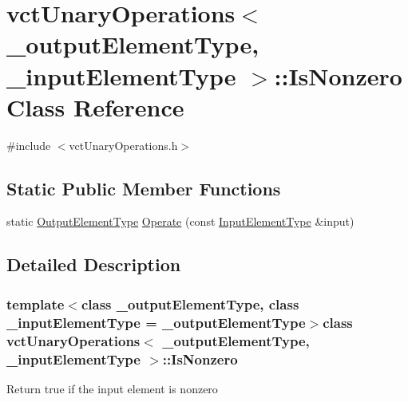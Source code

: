 \hypertarget{classvct_unary_operations_1_1_is_nonzero}{\section{vct\-Unary\-Operations$<$ \-\_\-output\-Element\-Type, \-\_\-input\-Element\-Type $>$\-:\-:Is\-Nonzero Class Reference}
\label{classvct_unary_operations_1_1_is_nonzero}
}


{\ttfamily \#include $<$vct\-Unary\-Operations.\-h$>$}

\subsection*{Static Public Member Functions}
\begin{DoxyCompactItemize}
\item 
static \hyperlink{classvct_unary_operations_a42306ac3dd20d32c6d6c66ac3fa2e7b9}{Output\-Element\-Type} \hyperlink{classvct_unary_operations_1_1_is_nonzero_a5ba07619b5ac86c36518c768a218ad41}{Operate} (const \hyperlink{classvct_unary_operations_abf3b77bb7b8abd7ba72a6a45a65696a7}{Input\-Element\-Type} \&input)
\end{DoxyCompactItemize}


\subsection{Detailed Description}
\subsubsection*{template$<$class \-\_\-output\-Element\-Type, class \-\_\-input\-Element\-Type = \-\_\-output\-Element\-Type$>$class vct\-Unary\-Operations$<$ \-\_\-output\-Element\-Type, \-\_\-input\-Element\-Type $>$\-::\-Is\-Nonzero}

Return true if the input element is nonzero 

